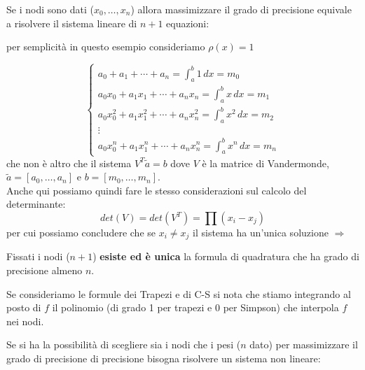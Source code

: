 \documentclass[12pt,a4paper,]{report}
\begin{document}
Se i nodi sono dati ($x_0,\dots, x_n$) allora massimizzare il grado di precisione equivale a risolvere il sistema lineare di $n+1$ equazioni:
\begin{nota}
    per semplicità in questo esempio consideriamo $\rho(x) = 1$
\end{nota}
\[
\begin{cases}
a_0 + a_1 + \cdots + a_n
= \displaystyle\int_a^b 1 \, dx
= m_0 \\[6pt]

a_0 x_0 + a_1 x_1 + \cdots + a_n x_n
= \displaystyle\int_a^b x \, dx
= m_1 \\[6pt]

a_0 x_0^{2} + a_1 x_1^{2} + \cdots + a_n x_n^{2}
= \displaystyle\int_a^b x^{2} \, dx
= m_2 \\[6pt]

\vdots \\[4pt]

a_0 x_0^{n} + a_1 x_1^{n} + \cdots + a_n x_n^{n}
= \displaystyle\int_a^b x^{n} \, dx
= m_n
\end{cases}
\]
che non è altro che il sistema $V^T\tilde{a} = b$ dove $V$ è la matrice di Vandermonde, $\tilde{a}=[a_0, \dots, a_n]$ e $b = [m_0, \dots , m_n]$.\\
Anche qui possiamo quindi fare le stesso considerazioni sul calcolo del determinante:
\[
det(V) = det(V^T) = \prod (x_i - x_j)
\]
per cui possiamo concludere che se $x_i \ne x_j$ il sistema ha un'unica soluzione $\Rightarrow$ 
\begin{teorema}
    \label{th: unicita formula quadratura grado massimo}
    Fissati i nodi ($n+1$) \textbf{esiste ed è unica} la formula di quadratura che ha grado di precisione almeno $n$.
\end{teorema}
\begin{nota}
    Se consideriamo le formule dei Trapezi e di C-S si nota che stiamo integrando al posto di $f$ il polinomio (di grado 1 per trapezi e 0 per Simpson) che interpola $f$ nei nodi.
\end{nota}
Se si ha la possibilità di scegliere sia i nodi che i pesi ($n$ dato) per massimizzare il grado di precisione di precisione bisogna risolvere un sistema non lineare:
\end{document}
